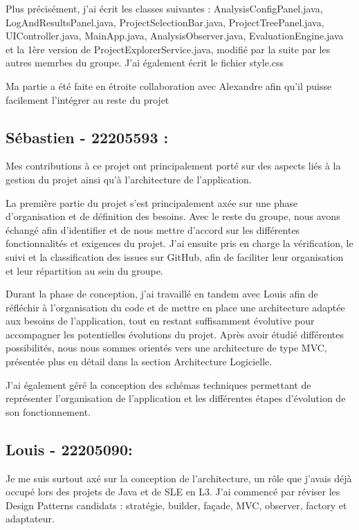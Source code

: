\documentclass[11pt,a4paper]{article}
\begin{document}
Plus précisément, j'ai écrit les classes suivantes : AnalysisConfigPanel.java, LogAndResultsPanel.java, ProjectSelectionBar.java, ProjectTreePanel.java, UIController.java, MainApp.java, AnalysisObserver.java, EvaluationEngine.java et la 1ère version de ProjectExplorerService.java, modifié par la suite par les autres memrbes du groupe. J'ai également écrit le fichier style.css

Ma partie a été faite en étroite collaboration avec Alexandre afin qu'il puisse facilement l'intégrer au reste du projet

\subsection*{Sébastien - 22205593 :}
Mes contributions à ce projet ont principalement porté sur des aspects liés à la gestion du projet ainsi qu’à l’architecture de l’application.

La première partie du projet s’est principalement axée sur une phase d’organisation et de définition des besoins. Avec le reste du groupe, nous avons échangé afin d’identifier et de nous mettre d’accord sur les différentes fonctionnalités et exigences du projet. J’ai ensuite pris en charge la vérification, le suivi et la classification des issues sur GitHub, afin de faciliter leur organisation et leur répartition au sein du groupe.

Durant la phase de conception, j’ai travaillé en tandem avec Louis afin de réfléchir à l’organisation du code et de mettre en place une architecture adaptée aux besoins de l’application, tout en restant suffisamment évolutive pour accompagner les potentielles évolutions du projet. Après avoir étudié différentes possibilités, nous nous sommes orientés vers une architecture de type MVC, présentée plus en détail dans la section Architecture Logicielle.

J’ai également géré la conception des schémas techniques permettant de représenter l’organisation de l’application et les différentes étapes d’évolution de son fonctionnement.

\subsection*{Louis - 22205090:}
Je me suis surtout axé sur la conception de l'architecture, un rôle que j'avais déjà occupé lors des projets de Java et de SLE en L3. J'ai commencé par réviser les Design Patterns candidats : stratégie, builder, façade, MVC, observer, factory et adaptateur.
\end{document}

